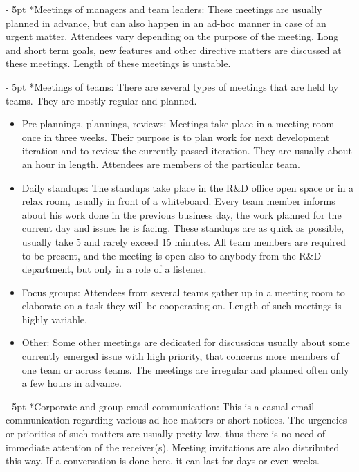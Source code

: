 \documentclass[11pt,singleside]{myfithesis2}
\makeatletter
\renewcommand\paragraph{
   \vspace{-10pt}
   \@startsection{paragraph}{4}{0mm}
      {\baselineskip}
      {- 5pt}
      {\normalfont\normalsize\bfseries}
}
\makeatother
\begin{document}
\paragraph*{Meetings of managers and team leaders: } These meetings are usually planned in advance, but can also happen in an ad-hoc manner in case of an urgent matter. Attendees vary depending on the purpose of the meeting. Long and short term goals, new features and other directive matters are discussed at these meetings. Length of these meetings is unstable.

\paragraph*{Meetings of teams: } There are several types of meetings that are held by teams. They are mostly regular and planned.
\begin{itemize}
	\item{Pre-plannings, plannings, reviews:} Meetings take place in a meeting room once in three weeks. Their purpose is to plan work for next development iteration and to review the currently passed iteration. They are usually about an hour in length. Attendees are members of the particular team. 
	\item{Daily standups:} The standups take place in the R\&D office open space or in a relax room, usually in front of a whiteboard. Every team member informs about his work done in the previous business day, the work planned for the current day and issues he is facing. These standups are as quick as possible, usually take 5 and rarely exceed 15 minutes. All team members are required to be present, and the meeting is open also to anybody from the R\&D department, but only in a role of a listener.
	\item{Focus groups:} Attendees from several teams gather up in a meeting room to elaborate on a task they will be cooperating on. Length of such meetings is highly variable.
	\item{Other:} Some other meetings are dedicated for discussions usually about some currently emerged issue with high priority, that concerns more members of one team or across teams. The meetings are irregular and planned often only a few hours in advance.
\end{itemize}

\paragraph*{Corporate and group email communication: } This is a casual email communication regarding various ad-hoc matters or short notices. The urgencies or priorities of such matters are usually pretty low, thus there is no need of immediate attention of the receiver(s). Meeting invitations are also distributed this way. If a conversation is done here, it can last for days or even weeks.
\end{document}
